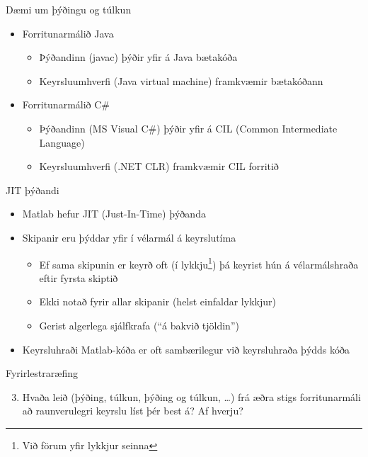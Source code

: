 \documentclass{beamer}
\begin{document}
\begin{frame}{Dæmi um þýðingu og túlkun}
\begin{itemize}
 \item Forritunarmálið Java
 \begin{itemize}
  \item Þýðandinn (javac) þýðir yfir á Java bætakóða
  \item Keyrsluumhverfi (Java virtual machine) framkvæmir bætakóðann
 \end{itemize}
\end{itemize}
\begin{itemize}
 \item Forritunarmálið C\#
 \begin{itemize}
  \item Þýðandinn (MS Visual C\#) þýðir yfir á CIL (Common Intermediate Language)
  \item Keyrsluumhverfi (.NET CLR) framkvæmir CIL forritið
 \end{itemize}
\end{itemize}
\end{frame}

\begin{frame}{JIT þýðandi}
\begin{itemize}
 \item Matlab hefur JIT (Just-In-Time) þýðanda
 \item Skipanir eru þýddar yfir í vélarmál á keyrslutíma
 \begin{itemize}
  \item Ef sama skipunin er keyrð oft (í lykkju\footnote{Við förum yfir lykkjur seinna}) þá keyrist hún á vélarmálshraða eftir fyrsta skiptið
  \item Ekki notað fyrir allar skipanir (helst einfaldar lykkjur)
  \item Gerist algerlega sjálfkrafa (``á bakvið tjöldin'')
 \end{itemize}
 \item Keyrsluhraði Matlab-kóða er oft sambærilegur við keyrsluhraða þýdds kóða
\end{itemize}
\end{frame}

\begin{frame}{Fyrirlestraræfing}
\begin{enumerate}
\setcounter{enumi}{2}
 \item Hvaða leið (þýðing, túlkun, þýðing og túlkun, \ldots) frá æðra stigs forritunarmáli að raunverulegri keyrslu líst þér best á? Af hverju?
\end{enumerate}
\end{frame}
\end{document}
